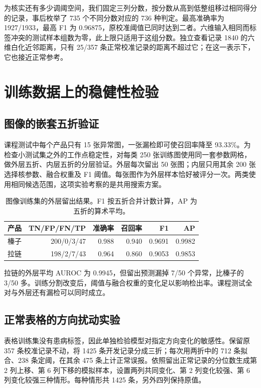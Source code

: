 \documentclass[sigconf,nonacm,screen]{acmart}
\begin{document}
为核实还有多少调阈空间，我们固定三列分数，按分数从高到低整组移过相同得分的记录，事后枚举了 735 个不同分数对应的 736 种判定。最高准确率为 1927/1933，最高 F1 为 0.96875，原校准阈值已同时达到二者。六维输入相同而标签冲突的测试样本组数为零，此上限只适用于这组分数。独立查看记录 1840 的六维白化近邻距离，只有 25/357 条正常校准记录的距离不超过它；在这一表示下，它也接近正常参考。

\section{训练数据上的稳健性检验}
\subsection{图像的嵌套五折验证}
课程测试中每个产品只有 15 张异常图，一张漏检即可使召回率降至 93.33\%。为检查小测试集之外的工作点稳定性，对每类 250 张训练图使用同一套参数网格，做外层五折、内层五折的分层验证。外层每次留出 50 张图；内层只用其余 200 张选择核参数、融合权重及 F1 阈值。每张图作为外层样本恰好被评分一次。两类使用相同候选范围，这项实验考察的是共用搜索方案。

\begin{table}[ht]\centering\caption{图像训练集的外层留出结果。F1 按五折合并计数计算，AP 为五折的算术平均。}\label{tab:nested}
\setlength{\tabcolsep}{3.2pt}
\begin{tabular}{lrrrrr}\toprule
产品&TN/FP/FN/TP&准确率&召回率&F1&AP\\\midrule
榛子&200/0/3/47&0.988&0.940&0.9691&0.9982\\
拉链&198/2/7/43&0.964&0.860&0.9053&0.9853\\\bottomrule
\end{tabular}\end{table}

拉链的外层平均 AUROC 为 0.9945，但留出预测漏掉 7/50 个异常，比榛子的 3/50 多。训练分割改变后，阈值与融合权重的变化足以影响检出率。课程测试全对与外层还有漏检可以同时成立。

\subsection{正常表格的方向扰动实验}
表格训练集没有患病标签，因此单独检验模型对指定方向变化的敏感性。保留原 357 条校准记录不动，将 1425 条开发记录分成三折；每次用两折中的 712 条拟合、238 条定阈，在其余 475 条上计正常误报。依照留出正常记录的分位数生成第 2 列上移、第 6 列下移的模拟样本，设置两列共同变化、第 2 列变化较强、第 6 列变化较强三种情形。每种情形共 1425 条，另外四列保持原值。
\end{document}
